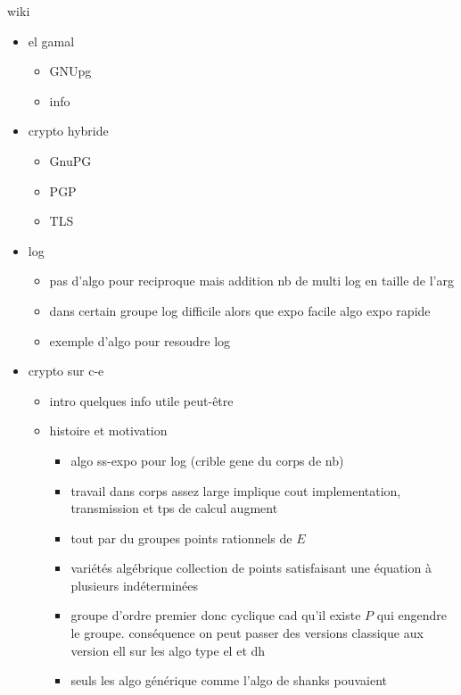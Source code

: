 wiki
\begin{itemize}
    \item el gamal
        \begin{itemize}
            \item GNUpg
            \item info
        \end{itemize}
    \item crypto hybride
        \begin{itemize}
            \item GnuPG
            \item PGP
            \item TLS
        \end{itemize}
    \item log
        \begin{itemize}
            \item pas d'algo pour reciproque mais addition nb de multi log en taille de l'arg
            \item dans certain groupe log difficile alors que expo facile algo expo rapide
            \item exemple d'algo pour resoudre log
        \end{itemize}
    \item crypto sur c-e
        \begin{itemize}
            \item intro quelques info utile peut-être
            \item histoire et motivation
                \begin{itemize}
                    \item algo ss-expo pour log (crible gene du corps de nb)
                    \item travail dans corps assez large implique cout implementation,
                        transmission et tps de calcul augment
                    \item tout par du groupes points rationnels de $E$ 
                    \item variétés algébrique collection de points satisfaisant une équation
                        à plusieurs indéterminées
                    \item groupe d'ordre premier donc cyclique cad qu'il existe $P$ qui
                        engendre le groupe. conséquence on peut passer des versions
                        classique aux version ell sur les algo type el et dh
                    \item seuls les algo générique comme l'algo de shanks pouvaient

\end{itemize}
\end{itemize}
\end{itemize}
